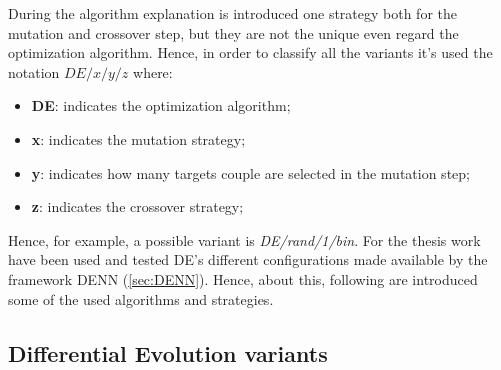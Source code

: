 During the algorithm explanation is introduced one strategy both for the mutation and crossover step, but they are not the unique even regard the optimization algorithm. Hence, in order to classify all the variants it's used the notation $DE/x/y/z$ where:
\begin{itemize}
	\item{\textbf{DE}: indicates the optimization algorithm;}
	\item{\textbf{x}: indicates the mutation strategy;}
	\item{\textbf{y}: indicates how many targets couple are selected in the mutation step;}
	\item{\textbf{z}: indicates the crossover strategy;}
\end{itemize}
Hence, for example, a possible variant is \textit{DE/rand/1/bin}. For the thesis work have been used and tested DE's different configurations made available by the framework DENN (\ref{sec:DENN}). Hence, about this, following are introduced some of the used algorithms and strategies.
\subsection{Differential Evolution variants}
